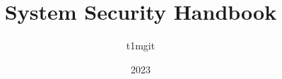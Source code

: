 \documentclass[a4paper,12pt]{book}
\begin{document}
\author{t1mgit}
\title{System Security Handbook}
\date{2023}

\frontmatter
\maketitle
\tableofcontents

\mainmatter





\backmatter
\end{document}
